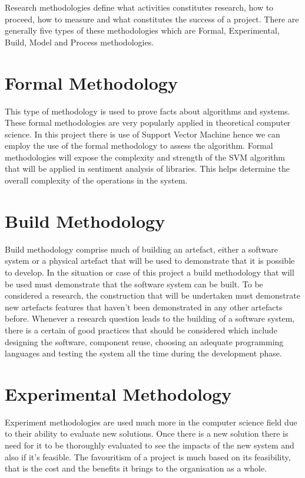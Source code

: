 \documentclass[12pt]{report}
\begin{document}
	Research methodologies define what activities constitutes research, how to proceed, how to measure and what constitutes the success of a project. There are generally five types of these methodologies which are Formal, Experimental, Build, Model and Process methodologies.\\
		
	\section{Formal Methodology}
	This type of methodology is used to prove facts about algorithms and systems. These formal methodologies are very popularly applied in theoretical computer science. In this project there is use of Support Vector Machine hence we can employ the use of the formal methodology to assess the algorithm. Formal methodologies will expose the complexity and strength of the SVM algorithm that will be applied in sentiment analysis of libraries. This helps determine the overall complexity of the operations in the system.\\
	
	\section{Build Methodology}
	Build methodology comprise much of building an artefact, either a software system or a physical artefact that will be used to demonstrate that it is possible to develop. In the situation or case of this project a build methodology that will be used must demonstrate that the software system can be built. To be considered a research, the construction that will be undertaken must demonstrate new artefacts features that haven’t been demonstrated in any other artefacts before. Whenever a research question leads to the building of a software system, there is a certain of good practices that should be considered which include designing the software, component reuse, choosing an adequate programming languages and testing the system all the time during the development phase.\\
	
	\section{Experimental Methodology}
	Experiment methodologies are used much more in the computer science field due to their ability to evaluate new solutions. Once there is a new solution there is need for it to be thoroughly evaluated to see the impacts of the new system and also if it’s feasible. The favouritism of a project is much based on its feasibility, that is the cost and the benefits it brings to the organisation as a whole.\\
	
\end{document}
